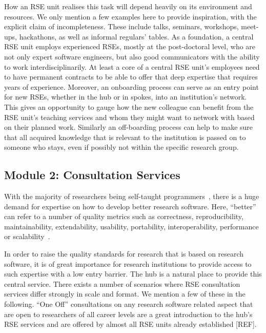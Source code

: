 \documentclass[a4paper]{article}
\makeatletter
\newcommand*{\eg}{e.\,g.\@\xspace}
\makeatother
\begin{document}
How an RSE unit realises this task will depend heavily on its environment and resources.
We only mention a few examples here to provide inspiration, with the explicit claim of incompleteness.
These include talks, seminars, workshops, meet-ups, hackathons, as well as informal regulars' tables.
As a foundation, a central RSE unit employs experienced RSEs, mostly at the post-doctoral level, who are not only expert software engineers, but also good communicators with the ability to work interdisciplinarily.
At least a core of a central RSE unit's employees need to have permanent contracts to be able to offer that deep expertise that requires years of experience.
Moreover, an onboarding process can serve as an entry point for new RSEs, whether in the hub or in spokes, into an institution's network.
This gives an opportunity to gauge how the new colleague can benefit from the RSE unit's teaching services and whom they might want to network with based on their planned work.
Similarly an off-boarding process can help to make sure that all acquired knowledge that is relevant to the institution is passed on to someone who stays, even if possibly not within the specific research group.

\subsection{Module 2: Consultation Services}%
\label{sec:consultation}

With the majority of researchers being self-taught programmers~\autocite{Carver2013}, there is a huge demand for expertise on how to develop better research software.
Here, “better” can refer to a number of quality metrics such as correctness, reproducibility, maintainability, extendability, usability, portability, interoperability, performance or scalability~\autocite[Chapter 16]{Schulmeyer2008}.

In order to raise the quality standards for research that is based on research software, it is of great importance for research institutions to provide access to such expertise with a low entry barrier.
The hub is a natural place to provide this central service.
There exists a number of scenarios where RSE consultation services differ strongly in scale and format.
We mention a few of these in the following.
“One Off” consultations on any research software related aspect that are open to researchers of all career levels are
a great introduction to the hub's RSE services and are offered by almost all RSE units already established [REF].
\end{document}
